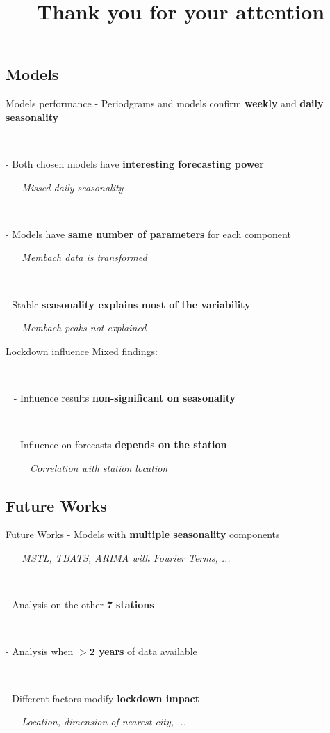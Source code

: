 \documentclass{beamer}
\begin{document}
\subsection{Models}

\begin{frame}{Models performance}
	- Periodgrams and models confirm \textbf{weekly} and \textbf{daily seasonality}

	~

	- Both chosen models have \textbf{interesting forecasting power}

	~ ~ \textit{Missed daily seasonality}

	~

	- Models have \textbf{same number of parameters} for each component

	~ ~ \textit{Membach data is transformed}

	~

	- Stable \textbf{seasonality explains most of the variability}

	~ ~ \textit{Membach peaks not explained}
\end{frame}

\begin{frame}{Lockdown influence}
	Mixed findings:

	~

	~ - Influence results \textbf{non-significant on seasonality}

	~

	~ - Influence on forecasts \textbf{depends on the station}

	~ ~ ~ \textit{Correlation with station location}

\end{frame}

\subsection{Future Works}
\begin{frame}{Future Works}
	- Models with \textbf{multiple seasonality} components

	~ ~ \textit{MSTL, TBATS, ARIMA with Fourier Terms, ...}

	~

	- Analysis on the other \textbf{7 stations}

	~

	- Analysis when \textbf{$\mathbf{> 2}$ years} of data available

	~

	- Different factors modify \textbf{lockdown impact}

	~ ~ \textit{Location, dimension of nearest city, ...}
\end{frame}

\title{Thank you for your attention}
\date{}
\author{}
\institute{}
\begin{frame}
	\titlepage
\end{frame}
	
\end{document}
